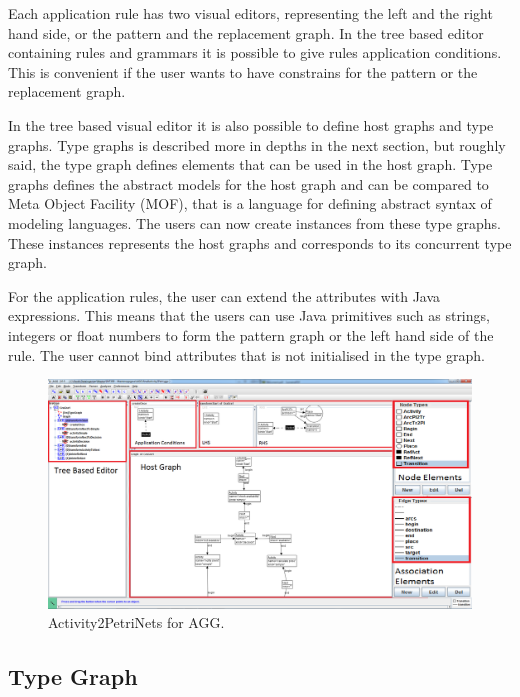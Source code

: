\indent Each application rule has two visual editors, representing the left and
the right hand side, or the pattern and the replacement graph. In the tree
based editor containing rules and grammars it is possible to give rules application
conditions. This is convenient if the user wants to have constrains for the
pattern or the replacement graph.

\indent In the tree based visual editor it is also possible to define host
graphs and type graphs. Type graphs is described more in depths in the next
section, but roughly said, the type graph defines elements that can be used in
the host graph. Type graphs defines the abstract models for the host graph and
can be compared to Meta Object Facility (MOF)\cite{MOF}, that is a language for
defining abstract syntax of modeling languages. The users can now create instances
from these type graphs. These instances represents the host graphs and
corresponds to its concurrent type graph. 

\indent For the application rules, the user can extend the attributes with Java
expressions. This means that the users can use Java primitives such as strings,
integers or float numbers to form the pattern graph or the left hand side of
the rule. The user cannot bind attributes that is not initialised in the type graph. 

\begin{figure}[H]
	\centering
	\includegraphics[scale=0.3]{figures/AGGscreen.png}
	\caption{Activity2PetriNets for AGG.}
	\label{fig:AGGScreen}
\end{figure}

\subsection{Type Graph}

